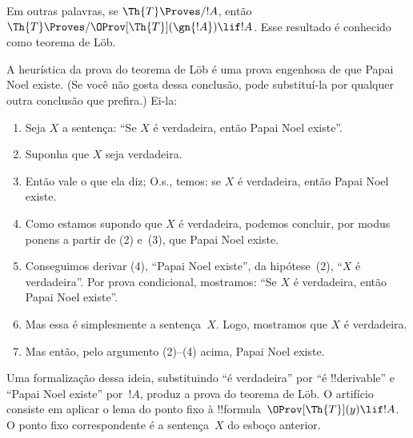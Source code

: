 \documentclass[../../../include/open-logic-section]{subfiles}
\begin{document}
Em outras palavras, se $\Th{T} \Proves/ !A$, então $\Th{T} \Proves/
\OProv[\Th{T}](\gn{!A}) \lif !A$. Esse resultado é conhecido como teorema
de L\"ob.

\begin{explain}
A heurística da prova do teorema de L\"ob é uma prova engenhosa de que Papai
Noel existe. (Se você não gosta dessa conclusão, pode substituí-la por
qualquer outra conclusão que prefira.) Ei-la:
\begin{enumerate}
\item Seja $X$ a sentença: ``Se $X$ é verdadeira, então Papai Noel
  existe''.
\item Suponha que $X$ seja verdadeira.
\item Então vale o que ela diz; O.s.\@, temos: se $X$ é verdadeira, então
  Papai Noel existe.
\item Como estamos supondo que $X$ é verdadeira, podemos concluir, por
  modus ponens a partir de (2) e~(3), que Papai Noel existe.
\item Conseguimos derivar (4), ``Papai Noel existe'', da hipótese~(2),
  ``$X$ é verdadeira''. Por prova condicional, mostramos: ``Se $X$ é
  verdadeira, então Papai Noel existe''.
\item Mas essa é simplesmente a sentença~$X$. Logo, mostramos que $X$ é
  verdadeira.
\item Mas então, pelo argumento (2)--(4) acima, Papai Noel existe.
\end{enumerate}
Uma formalização dessa ideia, substituindo ``é verdadeira'' por ``é
!!{derivable}'' e ``Papai Noel existe'' por~$!A$, produz a prova do teorema
de L\"ob. O artifício consiste em aplicar o lema do ponto fixo à
!!{formula}~$\OProv[\Th{T}](y) \lif !A$. O ponto fixo correspondente é a
sentença~$X$ do esboço anterior.
\end{explain}
\end{document}
